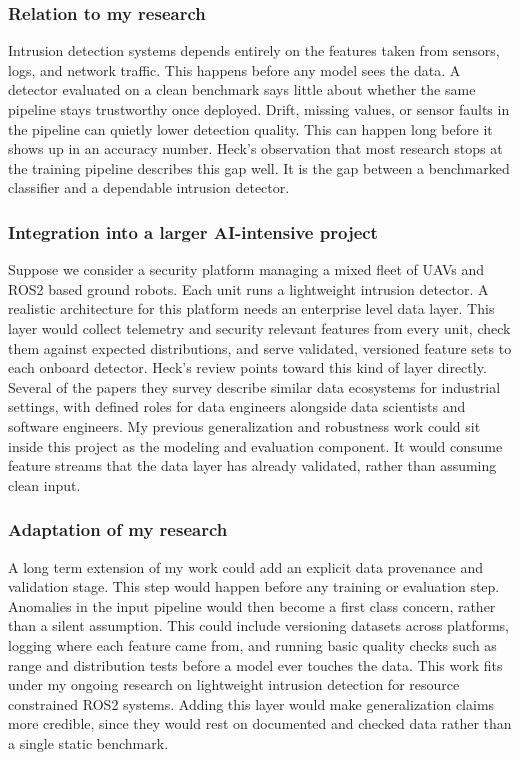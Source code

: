 \documentclass[11pt,a4paper]{article}
\begin{document}
\subsubsection{Relation to my research}
Intrusion detection systems depends entirely on the features taken from sensors, logs, and network traffic. This happens before any model sees the data. A detector evaluated on a clean benchmark says little about whether the same pipeline stays trustworthy once deployed. Drift, missing values, or sensor faults in the pipeline can quietly lower detection quality. This can happen long before it shows up in an accuracy number. Heck's observation that most research stops at the training pipeline describes this gap well. It is the gap between a benchmarked classifier and a dependable intrusion detector.

\subsubsection{Integration into a larger AI-intensive project}
Suppose we consider a security platform managing a mixed fleet of UAVs and ROS2 based ground robots. Each unit runs a lightweight intrusion detector. A realistic architecture for this platform needs an enterprise level data layer. This layer would collect telemetry and security relevant features from every unit, check them against expected distributions, and serve validated, versioned feature sets to each onboard detector. Heck's review points toward this kind of layer directly. Several of the papers they survey describe similar data ecosystems for industrial settings, with defined roles for data engineers alongside data scientists and software engineers. My previous generalization and robustness work could sit inside this project as the modeling and evaluation component. It would consume feature streams that the data layer has already validated, rather than assuming clean input.

\subsubsection{Adaptation of my research}
A long term extension of my work could add an explicit data provenance and validation stage. This step would happen before any training or evaluation step. Anomalies in the input pipeline would then become a first class concern, rather than a silent assumption. This could include versioning datasets across platforms, logging where each feature came from, and running basic quality checks such as range and distribution tests before a model ever touches the data. This work fits under my ongoing research on lightweight intrusion detection for resource constrained ROS2 systems. Adding this layer would make generalization claims more credible, since they would rest on documented and checked data rather than a single static benchmark.
\end{document}
